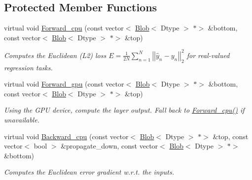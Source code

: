 \subsection*{Protected Member Functions}
\begin{DoxyCompactItemize}
\item 
virtual void \mbox{\hyperlink{classcaffe_1_1_euclidean_loss_layer_a3bc5a947caadac1a352a89b08720c7e7}{Forward\+\_\+cpu}} (const vector$<$ \mbox{\hyperlink{classcaffe_1_1_blob}{Blob}}$<$ Dtype $>$ $\ast$$>$ \&bottom, const vector$<$ \mbox{\hyperlink{classcaffe_1_1_blob}{Blob}}$<$ Dtype $>$ $\ast$$>$ \&top)
\begin{DoxyCompactList}\small\item\em Computes the Euclidean (L2) loss $ E = \frac{1}{2N} \sum\limits_{n=1}^N \left| \left| \hat{y}_n - y_n \right| \right|_2^2 $ for real-\/valued regression tasks. \end{DoxyCompactList}\item 
\mbox{\label{classcaffe_1_1_euclidean_loss_layer_a35f3694e9dd7e1920e26158e761fd8a0}} 
virtual void \mbox{\hyperlink{classcaffe_1_1_euclidean_loss_layer_a35f3694e9dd7e1920e26158e761fd8a0}{Forward\+\_\+gpu}} (const vector$<$ \mbox{\hyperlink{classcaffe_1_1_blob}{Blob}}$<$ Dtype $>$ $\ast$$>$ \&bottom, const vector$<$ \mbox{\hyperlink{classcaffe_1_1_blob}{Blob}}$<$ Dtype $>$ $\ast$$>$ \&top)
\begin{DoxyCompactList}\small\item\em Using the G\+PU device, compute the layer output. Fall back to \mbox{\hyperlink{classcaffe_1_1_euclidean_loss_layer_a3bc5a947caadac1a352a89b08720c7e7}{Forward\+\_\+cpu()}} if unavailable. \end{DoxyCompactList}\item 
virtual void \mbox{\hyperlink{classcaffe_1_1_euclidean_loss_layer_a577f5dad9889d01461348a4c89277089}{Backward\+\_\+cpu}} (const vector$<$ \mbox{\hyperlink{classcaffe_1_1_blob}{Blob}}$<$ Dtype $>$ $\ast$$>$ \&top, const vector$<$ bool $>$ \&propagate\+\_\+down, const vector$<$ \mbox{\hyperlink{classcaffe_1_1_blob}{Blob}}$<$ Dtype $>$ $\ast$$>$ \&bottom)
\begin{DoxyCompactList}\small\item\em Computes the Euclidean error gradient w.\+r.\+t. the inputs. \end{DoxyCompactList}\item 
\mbox{\label{classcaffe_1_1_euclidean_loss_layer_aa22a0ef4e0ab9d6a77be67c3d967b648}} 

\end{DoxyCompactItemize}
